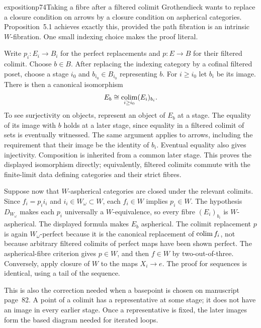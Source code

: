\begin{dcomment}{exposition}{p74}{Taking a fibre after a filtered colimit}
Grothendieck wants to replace a closure condition on arrows by a closure condition on aspherical categories. Proposition~5.1 achieves exactly this, provided the path fibration is an intrinsic $W$-fibration. One small indexing choice makes the proof literal.

Write $p_i:E_i\to B_i$ for the perfect replacements and $p:E\to B$ for their filtered colimit. Choose $b\in B$. After replacing the indexing category by a cofinal filtered poset, choose a stage $i_0$ and $b_{i_0}\in B_{i_0}$ representing $b$. For $i\geq i_0$ let $b_i$ be its image. There is then a canonical isomorphism
\[
 E_b\cong\mathop{\rm colim}_{i\geq i_0}(E_i)_{b_i}.
\]
To see surjectivity on objects, represent an object of $E_b$ at a stage. The equality of its image with $b$ holds at a later stage, since equality in a filtered colimit of sets is eventually witnessed. The same argument applies to arrows, including the requirement that their image be the identity of $b_i$. Eventual equality also gives injectivity. Composition is inherited from a common later stage. This proves the displayed isomorphism directly; equivalently, filtered colimits commute with the finite-limit data defining categories and their strict fibres.

Suppose now that $W$-aspherical categories are closed under the relevant colimits. Since $f_i=p_i i_i$ and $i_i\in W_\omega\subset W$, each $f_i\in W$ implies $p_i\in W$. The hypothesis $D_{W_\omega}$ makes each $p_i$ universally a $W$-equivalence, so every fibre $(E_i)_{b_i}$ is $W$-aspherical. The displayed formula makes $E_b$ aspherical. The colimit replacement $p$ is again $W_\omega$-perfect because it is the canonical replacement of $\mathop{\rm colim}f_i$, not because arbitrary filtered colimits of perfect maps have been shown perfect. The aspherical-fibre criterion gives $p\in W$, and then $f\in W$ by two-out-of-three. Conversely, apply closure of $W$ to the maps $X_i\to e$. The proof for sequences is identical, using a tail of the sequence.

This is also the correction needed when a basepoint is chosen on manuscript page~82. A point of a colimit has a representative at some stage; it does not have an image in every earlier stage. Once a representative is fixed, the later images form the based diagram needed for iterated loops.
\end{dcomment}

